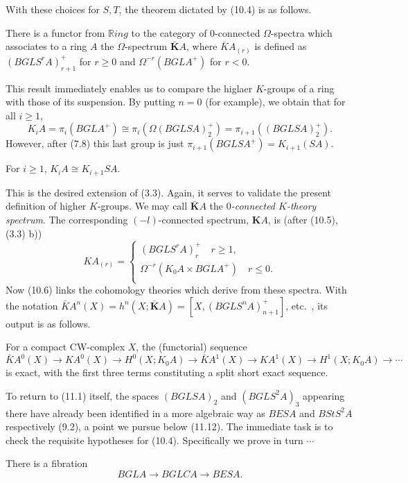With these choices for $S, T$, the theorem dictated by (10.4) is as follows.
\begin{theorem}
There is a functor from $\mathbb{R}ing$ to the category of $0$-connected $\Omega$-spectra which associates to a ring $A$ the $\Omega$-spectrum $\bar{\mathbf{K}}A$, where $\bar{K}A_{(r)}$ is defined as $(BGLS^rA)_{r+1}^+$ for $r\geqslant 0$ and $\Omega^{-r}(BGLA^+)$ for $r<0$.
\end{theorem}
This result immediately enables us to compare the higlaer $K$-groups of a ring with those of its suspension. By putting $n = 0$ (for example), we obtain that for all $i \geqslant 1$,
\[K_iA = \pi_i(BGLA^+) \cong \pi_i(\Omega(BGLSA)^+_2) = \pi_{i+1}((BGLSA)^+_2).\]
However, after (7.8) this last group is just $\pi_{i+1}(BGLSA^+) =K_{i+1}(SA)$.
\begin{corollary}
  For $i\geqslant  1$, $K_iA\cong K_{i+1}SA$.
\end{corollary}
This is the desired extension of (3.3). Again, it serves to validate the present definition of higher $K$-groups. We may call $\bar{\mathbf{K}}A$ the {\em $0$-connected $K$-theory spectrum}. The corresponding $(-l)$-connected spectrum, $\mathbf{K}A$, is (after (10.5), (3.3) b))
\[KA_{(r)}=
\begin{cases}
  (BGLS^rA)_r^+  \quad r\geqslant  1 ,\\
\Omega^{-r}(K_0A \times BGLA^+)\quad r\leqslant0 .\\
\end{cases}\]
Now (10.6) links the cohomology theories which derive from these spectra. With the notation $\bar{K}A^n(X) = h^n(X; \bar{\mathbf{K}}A) = [X, (BGLS^nA)^+_{n+1} ]$, etc.\ , its output is as follows.
\begin{corollary}
  For a compact CW-complex $X$, the (functorial) sequence
\[\bar{K}A^0(X)\longrightarrow KA^0(X) \longrightarrow H^0(X; K_0A) \longrightarrow \bar{K}A^1 (X)\longrightarrow KA^1 (X) \longrightarrow H^1 (X; K_0A) \longrightarrow \cdots\]
is exact, with the first three terms constituting a split short exact sequence.
\end{corollary}
To return to (11.1) itself, the spaces $(BGLSA)_2$ and $(BGLS^2A)_3$ appearing there have already been identified in a more algebraic way as $BESA$ and $BStS^2 A$ respectively (9.2), a point we pursue below (11.12). The immediate task is to check the requisite hypotheses for (10.4). Specifically we prove in turn $\cdots $

\begin{prop}\label{11.4}
  There is a fibration 
\[BGLA \longrightarrow BGLCA \longrightarrow BESA.\]
 \end{prop} 

